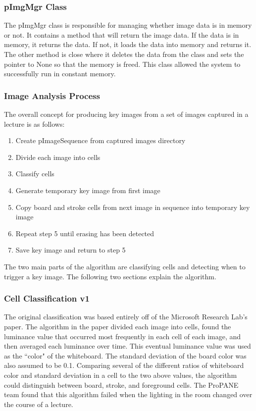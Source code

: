 \documentclass[]{article}
\begin{document}
			\subsubsection{pImgMgr Class}
				The pImgMgr class is responsible for managing whether image data is in memory or not. It contains a method that will return the image data. If the data is in memory, it returns the data. If not, it loads the data into memory and returns it. The other method is close where it deletes the data from the class and sets the pointer to None so that the memory is freed. This class allowed the system to successfully run in constant memory. 
				
			\subsubsection{Image Analysis Process}
				The overall concept for producing key images from a set of images captured in a lecture is as follows:
				\begin{enumerate}
					\item Create pImageSequence from captured images directory
					\item Divide each image into cells
					\item Classify cells
					\item Generate temporary key image from first image
					\item Copy board and stroke cells from next image in sequence into temporary key image
					\item Repeat step 5 until erasing has been detected
					\item Save key image and return to step 5
				\end{enumerate}
				The two main parts of the algorithm are classifying cells and detecting when to trigger a key image. The following two sections explain the algorithm.
				
			\subsubsection{Cell Classification v1}
				The original classification was based entirely off of the Microsoft Research Lab's paper. The algorithm in the paper divided each image into cells, found the luminance value that occurred most frequently in each cell of each image, and then averaged each luminance over time. This eventual luminance value was used as the ``color" of the whiteboard. The standard deviation of the board color was also assumed to be 0.1. Comparing several of the different ratios of whiteboard color and standard deviation in a cell to the two above values, the algorithm could distinguish between board, stroke, and foreground cells. The ProPANE team found that this algorithm failed when the lighting in the room changed over the course of a lecture. 
			
\end{document}
